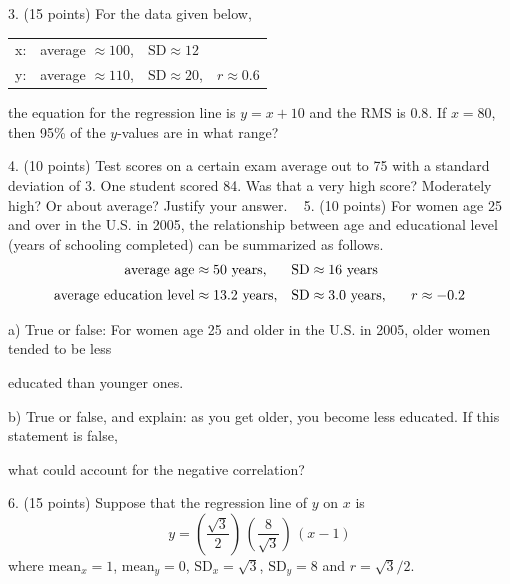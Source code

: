 \documentclass[10pt]{article}
\begin{document}
3. (15 points)
For the data given below, \vspace{-8pt}
\begin{center}
\begin{tabular}{llll}
x: & average $\approx 100$, & $\mbox{SD}\approx 12$\\
y: & average $\approx 110$, & $\mbox{SD}\approx 20$,  & $r\approx 0.6$\\
\end{tabular}\vspace{-8pt}
\end{center}
the equation for the regression line is $y=x+10$ and the RMS is $0.8$.
If $x=80$, then 95\% of the $y$-values are in what range?
\vspace{1.8in}



4. (10 points) Test scores on a certain exam average out to 75 with a standard 
deviation of 3.  One student scored 84.   Was that a very high score?  Moderately high?  
Or about average?  Justify your answer.
\vfill
\eject
{\ }
5. (10 points) For women age 25 and over in the U.S. in 2005, the relationship between
age and educational level (years of schooling completed) can be summarized as
follows. 
\begin{align*}
\mbox{average age}         & \approx \mbox{50 years,}    & \mbox{SD} & \approx \mbox{16 years}\\[3pt]
\mbox{average education level}  & \approx \mbox{13.2 years,}  & \mbox{SD} & \approx \mbox{3.0 years,
   \hspace{15pt}} r\approx -0.2
\end{align*}

\hspace{20pt} a) True or false:  For women age 25 and older in the U.S. in 2005, older women tended 
to be less\vspace{-5pt}

\hspace{20pt} \hphantom{a) }  educated than younger ones.
\bigskip

\hspace{20pt} b) True or false, and explain:  as you get older, you become less educated.  
If this statement is false,\vspace{-4pt}

\hspace{20pt} \hphantom{a) }
what could account for the negative correlation?  
\vspace{2in}


6. (15 points) Suppose that the regression line of $y$ on $x$ 
is \[y=\left(\frac{\sqrt{3}}{2}\right)\,\left(\frac{8}{\sqrt{3}}\right)\,(x-1)\] 
where $\mbox{mean}_x=1$, $\mbox{mean}_y=0$, $\mbox{SD}_x=\sqrt{3}$, $\mbox{SD}_y=8$
and $r=\sqrt{3}/2$.\vspace{3pt}
\end{document}
